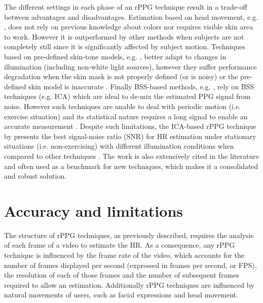 The different settings in each phase of an rPPG technique result in a trade-off between advantages and disadvantages. Estimation based on head movement, e.g. \textcite{6619284}, does not rely on previous knowledge about colors nor requires visible skin area to work. However it is outperformed by other methods when subjects are not completely still \parencite{li2014remote} since it is significantly affected by subject motion. Techniques based on pre-defined skin-tone models, e.g. \textcite{Wang_2016novel,de_Haan_2013}, better adapt to changes in illumination (including non-white light sources), however they suffer performance degradation when the skin mask is not properly defined (or is noisy) or the pre-defined skin model is inaccurate \parencite{Wang_2016algorithmic}. Finally BSS-based methods, e.g. \textcite{poh2011advancements}, rely on BSS techniques (e.g. ICA) which are ideal to de-mix the estimated PPG signal from noise. However such techniques are unable to deal with periodic motion (i.e. exercise situation) and its statistical nature requires a long signal to enable an accurate measurement \parencite{Wang_2016algorithmic}. Despite such limitations, the ICA-based rPPG technique by \textcite{poh2011advancements} presents the best signal-noise ratio (SNR) for HR estimation under stationary situations (i.e. non-exercising) with different illumination conditions when compared to other techniques \parencite{Wang_2016novel}. The work is also extensively cited in the literature and often used as a benchmark for new techniques, which makes it a consolidated and robust solution.

\section{Accuracy and limitations}

The structure of rPPG techniques, as previously described, requires the analysis of each frame of a video to estimate the HR. As a consequence, any rPPG technique is influenced by the frame rate of the video, which accounts for the number of frames displayed per second (expressed in frames per second, or FPS), the resolution of each of those frames and the number of subsequent frames required to allow an estimation. Additionally rPPG techniques are influenced by natural movements of users, such as facial expressions and head movement.

